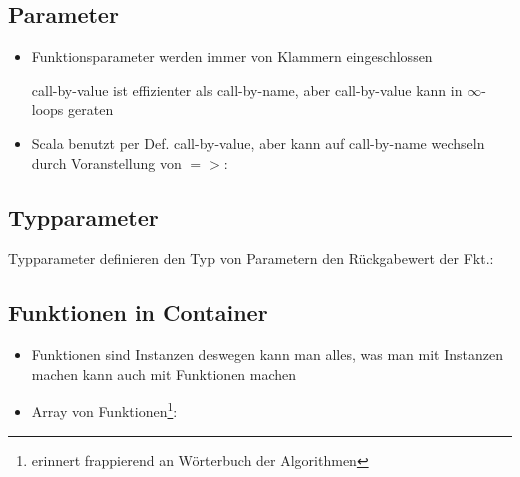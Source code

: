 \subsection{Parameter}
\begin{itemize}
  \item Funktionsparameter werden immer von Klammern eingeschlossen
  
  
  call-by-value ist effizienter als call-by-name, aber call-by-value
  kann in $\infty$-loops geraten
    
  \item Scala benutzt per Def. call-by-value, aber kann auf call-by-name
  wechseln durch Voranstellung von $=>$:
  
  
  
\end{itemize}


\subsection{Typparameter}
Typparameter definieren den Typ von Parametern \oder den 
Rückgabewert der Fkt.:
  
  


\subsection{Funktionen in Container}
\begin{itemize}
  \item Funktionen sind Instanzen \und deswegen kann man alles, was man
  mit Instanzen machen kann auch mit Funktionen machen
  \item Array von Funktionen\footnote{erinnert frappierend an
  Wörterbuch der Algorithmen}:
  
    
\end{itemize}


